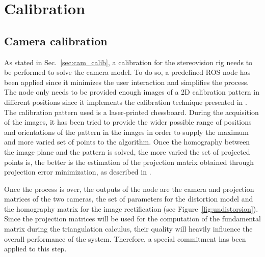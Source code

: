 \chapter{Calibration} %
\label{cha:calibration}

\section{Camera calibration} %
\label{sec:camera_calibration}
As stated in Sec.~\ref{sec:cam_calib}, a calibration for the stereovision rig needs to be performed to solve the camera model.
To do so, a predefined ROS node has been applied since it minimizes the user interaction and simplifies the process.
The node only needs to be provided enough images of a 2D calibration pattern in different positions since it implements the calibration technique presented in \cite{Zhang}.
The calibration pattern used is a laser-printed chessboard.
During the acquisition of the images, it has been tried to provide the wider possible range of positions and orientations of the pattern in the images in order to supply the maximum and more varied set of points to the algorithm.
Once the homography between the image plane and the pattern is solved, the more varied the set of projected points is, the better is the estimation of the projection matrix obtained through projection error minimization, as described in \cite{Hartley}.

Once the process is over, the outputs of the node are the camera and projection matrices of the two cameras, the set of parameters for the distortion model and the homography matrix for the image rectification (see Figure~\ref{fig:undistorsion}).
Since the projection matrices will be used for the computation of the fundamental matrix during the triangulation calculus, their quality will heavily influence the overall performance of the system.
Therefore, a special commitment has been applied to this step.

